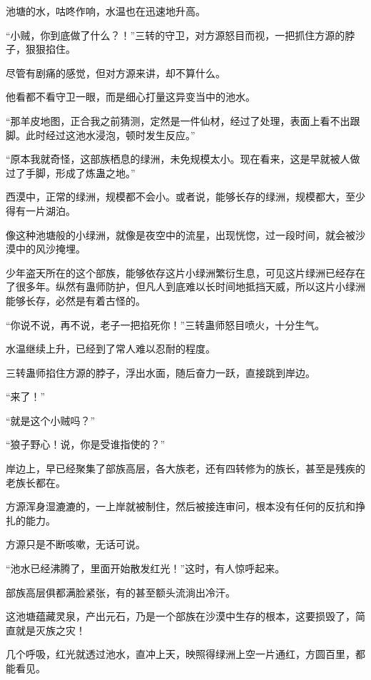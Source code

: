 
\begin{this_body}



池塘的水，咕咚作响，水温也在迅速地升高。

“小贼，你到底做了什么？！”三转的守卫，对方源怒目而视，一把抓住方源的脖子，狠狠掐住。

尽管有剧痛的感觉，但对方源来讲，却不算什么。

他看都不看守卫一眼，而是细心打量这异变当中的池水。

“那羊皮地图，正合我之前猜测，定然是一件仙材，经过了处理，表面上看不出跟脚。此时经过这池水浸泡，顿时发生反应。”

“原本我就奇怪，这部族栖息的绿洲，未免规模太小。现在看来，这是早就被人做过了手脚，形成了炼蛊之地。”

西漠中，正常的绿洲，规模都不会小。或者说，能够长存的绿洲，规模都大，至少得有一片湖泊。

像这种池塘般的小绿洲，就像是夜空中的流星，出现恍惚，过一段时间，就会被沙漠中的风沙掩埋。

少年盗天所在的这个部族，能够依存这片小绿洲繁衍生息，可见这片绿洲已经存在了很多年。纵然有蛊师防护，但凡人到底难以长时间地抵挡天威，所以这片小绿洲能够长存，必然是有着古怪的。

“你说不说，再不说，老子一把掐死你！”三转蛊师怒目喷火，十分生气。

水温继续上升，已经到了常人难以忍耐的程度。

三转蛊师掐住方源的脖子，浮出水面，随后奋力一跃，直接跳到岸边。

“来了！”

“就是这个小贼吗？”

“狼子野心！说，你是受谁指使的？”

岸边上，早已经聚集了部族高层，各大族老，还有四转修为的族长，甚至是残疾的老族长都在。

方源浑身湿漉漉的，一上岸就被制住，然后被接连审问，根本没有任何的反抗和挣扎的能力。

方源只是不断咳嗽，无话可说。

“池水已经沸腾了，里面开始散发红光！”这时，有人惊呼起来。

部族高层俱都满脸紧张，有的甚至额头流淌出冷汗。

这池塘蕴藏灵泉，产出元石，乃是一个部族在沙漠中生存的根本，这要损毁了，简直就是灭族之灾！

几个呼吸，红光就透过池水，直冲上天，映照得绿洲上空一片通红，方圆百里，都能看见。


\end{this_body}
